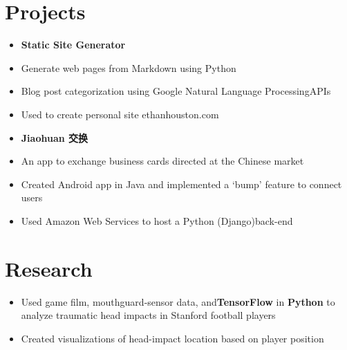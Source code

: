 \documentclass[]{houston-ethan-resume}
\begin{document}
\begin{minipage}[t]{0.66\textwidth}
\section{Projects}
\begin{multicols}{2}
\begin{itemize}
\item[] \textbf{Static Site Generator}
\item[] Generate web pages from Markdown using Python
\item[] Blog post categorization using Google ​Natural Language Processing​ APIs
\item[] Used to create personal site ​ethanhouston.com​
\end{itemize}
\columnbreak
\begin{itemize}
\item[] \textbf{Jiaohuan 交换}
\item[] An app to exchange business cards directed at
the Chinese market
\item[] Created​ Android ​app in ​Java​ and implemented a
‘bump’ feature to connect users
\item[] Used ​Amazon Web Services​ to host a ​Python
(Django) ​back-end
\end{itemize}
\end{multicols}


\section{Research}
\begin{itemize}
\item Used game film, mouthguard-sensor data, and ​\textbf{TensorFlow}​ in ​​\textbf{Python} ​to analyze traumatic head impacts in Stanford football players
\item Created visualizations of head-impact location based on player position
\end{itemize}
\sectionsep

\end{minipage}
\end{document}
